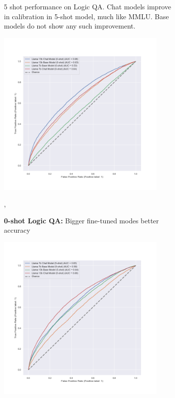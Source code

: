 \documentclass[11pt]{article}
\begin{document}
\begin{figure}
\begin{subfigure}[b]{0.49\textwidth}
         \caption{5 shot performance on Logic QA. Chat models improve in calibration in 5-shot model, much like MMLU. Base models do not show any such improvement.}
         \label{fig:5-shot-logicqa}
     \end{subfigure}     
     
     \hfill
     \begin{subfigure}[b]{0.49\textwidth}
         \centering \includegraphics[width=0.9\textwidth]{figures/0-shot-logic-qa-roc.png}
         \caption{\textbf{0-shot Logic QA:} Bigger fine-tuned modes better \\accuracy},
         \label{fig:0-shot-MMLU}
    \end{subfigure} 
     \begin{subfigure}[b]{0.49\textwidth}
         \centering \includegraphics[width=0.9\textwidth]{figures/5-shot-logic-qa-roc.png}

\end{subfigure}
\end{figure}
\end{document}
